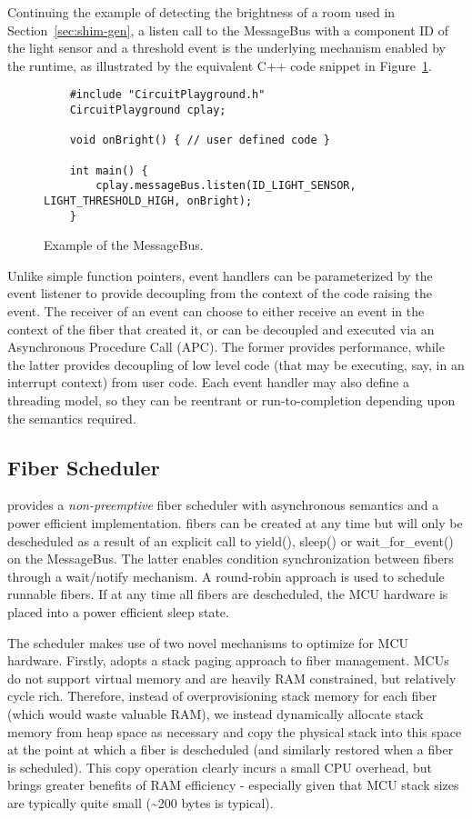 Continuing the example of detecting the brightness of a room used in Section~\ref{sec:shim-gen}, a listen call to the MessageBus with a component ID of the light sensor and a threshold event is the underlying mechanism enabled by the runtime, as illustrated by the equivalent C++ code snippet in Figure~\ref{fig:messageBus}.

\begin{figure}[t]
    \begin{lstlisting}
    #include "CircuitPlayground.h"
    CircuitPlayground cplay;

    void onBright() { // user defined code }

    int main() {
        cplay.messageBus.listen(ID_LIGHT_SENSOR, LIGHT_THRESHOLD_HIGH, onBright);
    }
    \end{lstlisting}
    \caption{\label{fig:messageBus}Example of the \CO MessageBus.}
\end{figure}

Unlike simple function pointers, \CO event handlers can be parameterized by the event listener to provide decoupling from the context of the code raising the event. The receiver of an event can choose to either receive an event in the context of the fiber that created it, or can be decoupled and executed via an Asynchronous Procedure Call (APC). The former provides performance, while the latter provides decoupling of low level code (that may be executing, say, in an interrupt context) from user code. Each event handler may also define a threading model, so they can be reentrant or run-to-completion depending upon the semantics required.

\subsection{Fiber Scheduler}
\CO provides a \emph{non-preemptive} fiber scheduler with asynchronous semantics and a power efficient implementation. \CO fibers can be created at any time but will only be descheduled as a result of an explicit call to yield(), sleep() or wait\_for\_event() on the MessageBus. The latter enables condition synchronization between fibers through a wait/notify mechanism. A round-robin approach is used to schedule runnable fibers. If at any time all fibers are descheduled, the MCU hardware is placed into a power efficient sleep state.

The \CO scheduler makes use of two novel mechanisms to optimize for MCU hardware. Firstly, \CO adopts a stack paging approach to fiber management. MCUs do not support virtual memory and are heavily RAM constrained, but relatively cycle rich. Therefore, instead of overprovisioning stack memory for each fiber (which would waste valuable RAM), we instead dynamically allocate stack memory from heap space as necessary and copy the physical stack into this space at the point at which a fiber is descheduled (and similarly restored when a fiber is scheduled). This copy operation clearly incurs a small CPU overhead, but brings greater benefits of RAM efficiency - especially given that MCU stack sizes are typically quite small (\textasciitilde200 bytes is typical).

